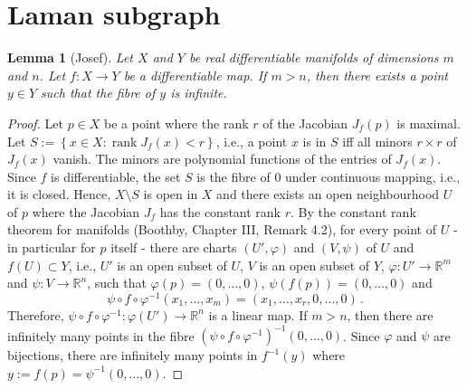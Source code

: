 \documentclass[a4paper, 11pt]{article}
\newcommand{\RR}{\mathbb{R}}
\DeclareMathOperator{\lcodim}{lcodim}
\DeclareMathOperator{\rank}{rank}
\newtheorem{lem}[thm]{Lemma}
\theoremstyle{definition}
\begin{document}

\newpage

\section{Laman subgraph}
\begin{lem}[Josef]
\label{lem:InfFibreManifolds}
Let $X$ and $Y$ be real differentiable manifolds of dimensions $m$ and $n$. Let $f:X\rightarrow Y$  be a differentiable map. If $m > n$, then there exists a point $y\in Y$ such that the fibre of $y$ is infinite.
\end{lem}
\begin{proof}
Let $p \in X$ be a point where the rank $r$ of the Jacobian $J_f(p)$ is maximal. Let $S:=\left\{x \in X \colon \rank J_f(x)<r \right\}$, i.e., a point $x$ is in $S$ iff all minors $r\times r$ of $J_f(x)$ vanish. The minors are polynomial functions of the entries of $J_f(x)$. Since $f$ is differentiable, the set $S$ is the fibre of 0 under continuous mapping, i.e., it is closed. Hence, $X\setminus S$ is open in $X$ and there exists  an open neighbourhood $U$ of $p$ where the Jacobian $J_f$ has the constant rank $r$. By the constant rank theorem for manifolds (Boothby, Chapter III, Remark 4.2), for every point of $U$ - in particular for $p$ itself - there are charts $(U',\varphi)$ and $(V,\psi)$ of $U$ and $f(U)\subset Y$, i.e., $U'$ is an open subset of $U$, $V$ is an open subset of $Y$, $\varphi:U'\rightarrow \RR^m$ and $\psi:V\rightarrow \RR^n$, such that $\varphi(p)=(0, \dots, 0)$, $\psi(f(p))=(0, \dots, 0)$ and 
$$
\psi\circ f\circ\varphi^{-1}(x_1, \dots, x_m)=(x_1, \dots, x_r, 0, \dots, 0)\,.
$$
Therefore, $\psi\circ f\circ\varphi^{-1}:\varphi(U')\rightarrow \RR^n $ is a linear map. If $m>n$, then there are infinitely many points in the fibre $(\psi\circ f\circ\varphi^{-1})^{-1}(0,\dots,0)$. Since $\varphi$ and $\psi$ are bijections, there  are infinitely many points in $f^{-1}(y)$ where $y:=f(p)=\psi^{-1}(0,\dots,0)$.
\end{proof}
\end{document}
